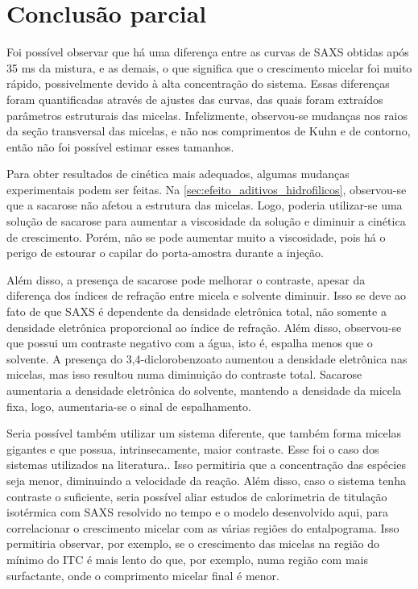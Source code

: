 	\FloatBarrier
	
	\section{Conclusão parcial}  
	
	Foi possível observar que há uma diferença entre as curvas de SAXS obtidas após 35 ms da mistura, e as demais, o que significa que o crescimento micelar foi muito rápido, possivelmente devido à alta concentração do sistema. Essas diferenças foram quantificadas através de ajustes das curvas, das quais foram extraídos parâmetros estruturais das micelas. Infelizmente, observou-se mudanças nos raios da seção transversal das micelas, e não nos comprimentos de Kuhn e de contorno, então não foi possível estimar esses tamanhos.
	
	Para obter resultados de cinética mais adequados, algumas mudanças experimentais podem ser feitas. Na \autoref{sec:efeito_aditivos_hidrofilicos}, observou-se que a sacarose não afetou a estrutura das micelas. Logo, poderia utilizar-se uma solução de sacarose para aumentar a viscosidade da solução e diminuir a cinética de crescimento. Porém, não se pode aumentar muito a viscosidade, pois há o perigo de estourar o capilar do porta-amostra durante a injeção.
	
	Além disso, a presença de sacarose pode melhorar o contraste, apesar da diferença dos índices de refração entre micela e solvente diminuir. Isso se deve ao fato de que SAXS é dependente da densidade eletrônica total, não somente a densidade eletrônica proporcional ao índice de refração. Além disso, observou-se que \TTAB{} possui um contraste negativo com a água, isto é, espalha menos que o solvente. A presença do 3,4-diclorobenzoato aumentou a densidade eletrônica nas micelas, mas isso resultou numa diminuição do contraste total. %
	Sacarose aumentaria a densidade eletrônica do solvente, mantendo a densidade da micela fixa, logo, aumentaria-se o sinal de espalhamento.
	
	Seria possível também utilizar um sistema diferente, que também forma micelas gigantes e que possua, intrinsecamente, maior contraste. Esse foi o caso dos sistemas utilizados na literatura.\cite{Jensen2014a, Jensen2013a, Jensen2016a}.	Isso permitiria que a concentração das espécies seja menor, diminuindo a velocidade da reação. Além disso, caso o sistema tenha contraste o suficiente, seria possível aliar estudos de calorimetria de titulação isotérmica com SAXS resolvido no tempo e o modelo desenvolvido aqui, para correlacionar o crescimento micelar com as várias regiões do entalpograma. Isso permitiria observar, por exemplo, se o crescimento das micelas na região do mínimo do ITC é mais lento do que, por exemplo, numa região com mais surfactante, onde o comprimento micelar final é menor.
	
